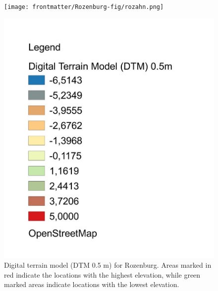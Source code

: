 \begin{figure}[htbp]
    \centering
    \begin{minipage}{0.70\linewidth}
        \texttt{[image: frontmatter/Rozenburg-fig/rozahn.png]}
        \caption{Digital terrain model (DTM 0.5 m) for Rozenburg. Areas marked in red indicate the locations with the highest elevation, while green marked areas indicate locations with the lowest elevation.}
        \label{AHNroz}
    \end{minipage}\hfill
    \begin{minipage}{0.30\linewidth}
        \includegraphics[width=\linewidth]{legendoff.jpg}
    \end{minipage}
\end{figure}


